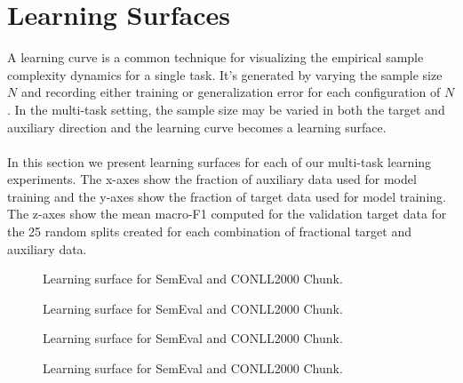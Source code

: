 \section{Learning Surfaces}
A learning curve is a common technique for visualizing the empirical sample complexity dynamics for a single task. It's generated by varying the sample size $N$ and recording either training or generalization error for each configuration of $N$. In the multi-task setting, the sample size may be varied in both the target and auxiliary direction and the learning curve becomes a learning surface.
\\\\
In this section we present learning surfaces for each of our multi-task learning experiments. The x-axes show the fraction of auxiliary data used for model training and the y-axes show the fraction of target data used for model training. The z-axes show the mean macro-F1 computed for the validation target data for the 25 random splits created for each combination of fractional target and auxiliary data.

\newpage
\pagestyle{empty}
\vspace*{2cm}
\begin{figure}[h!]
	\hspace*{-2cm}
	\caption{Learning surface for SemEval and CONLL2000 Chunk.}
\end{figure}
\begin{figure}[h!]
	\hspace*{-2cm}
	\caption{Learning surface for SemEval and CONLL2000 Chunk.}
\end{figure}
\newpage
\vspace*{2cm}
\begin{figure}[h!]
	\hspace*{-2cm}
	\caption{Learning surface for SemEval and CONLL2000 Chunk.}
\end{figure}
\begin{figure}[h!]
	\hspace*{-2cm}
	\caption{Learning surface for SemEval and CONLL2000 Chunk.}
\end{figure}
\newpage
\pagestyle{plain}
